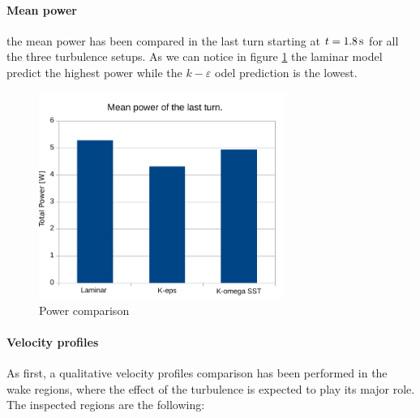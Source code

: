 \documentclass[a4paper,12pt]{article}
\newcommand{\kepsilon}[1]{$k\!-\!\varepsilon $ }
\begin{document}
\paragraph{Mean power}
the mean power has been compared in the last turn starting at $t=1.8\,\text{s}$ for all the three turbulence setups. 
As we can notice in figure \ref{fig:turbolence-powercomparison} the laminar model predict the highest power while the \kepsilon model prediction is the lowest.

\begin{figure}[H]
\centering
\includegraphics[width=8cm]{images/turbulence/MeanPower_comparison.pdf} 
\caption{Power comparison}
\label{fig:turbolence-powercomparison}
\centering
\end{figure}



\paragraph{Velocity profiles}
As first, a qualitative velocity profiles comparison has been performed in the wake regions,
where the effect of the turbulence is expected to play its major role.
The inspected regions are the following:
\begin{figure}[H]
\centering
{}
\end{figure}
\end{document}
